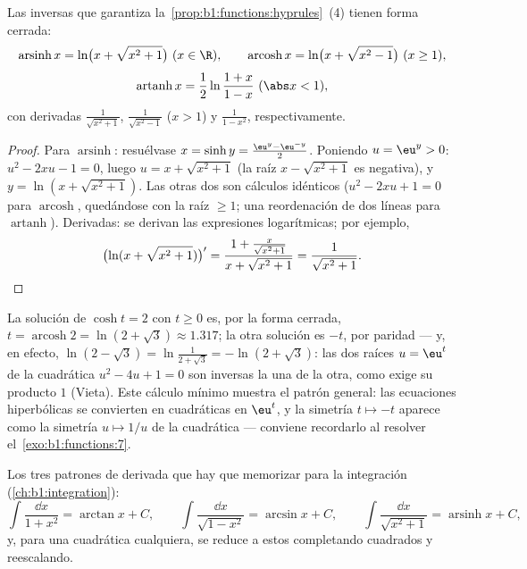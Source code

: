 \begin{proposition}\label{prop:b1:functions:invhyp}
Las inversas que garantiza la~\cref{prop:b1:functions:hyprules}~(4)
tienen forma cerrada:
\[
\operatorname{arsinh} x = \ln\bigl(x + \sqrt{x^2 + 1}\bigr)
\ (x \in \R),
\qquad
\operatorname{arcosh} x = \ln\bigl(x + \sqrt{x^2 - 1}\bigr)
\ (x \geq 1),
\]
\[
\operatorname{artanh} x = \frac 12 \ln\frac{1 + x}{1 - x}
\ (\abs x < 1),
\]
con derivadas $\frac{1}{\sqrt{x^2+1}}$, $\frac{1}{\sqrt{x^2-1}}$
($x > 1$) y $\frac{1}{1 - x^2}$, respectivamente.
\end{proposition}

\begin{proof}
Para $\operatorname{arsinh}$: resuélvase $x = \sinh y = \frac{\eu^y -
\eu^{-y}}{2}$. Poniendo $u = \eu^y > 0$: $u^2 - 2xu - 1 = 0$, luego
$u = x + \sqrt{x^2 + 1}$ (la raíz $x - \sqrt{x^2+1}$ es negativa), y
$y = \ln(x + \sqrt{x^2+1})$. Las otras dos son cálculos idénticos
($u^2 - 2xu + 1 = 0$ para $\operatorname{arcosh}$, quedándose con la
raíz $\geq 1$; una reordenación de dos líneas para
$\operatorname{artanh}$). Derivadas: se derivan las expresiones
logarítmicas; por ejemplo,
\[
\bigl(\ln(x + \sqrt{x^2+1})\bigr)'
= \frac{1 + \frac{x}{\sqrt{x^2+1}}}{x + \sqrt{x^2+1}}
= \frac{1}{\sqrt{x^2 + 1}} . \qedhere
\]
\end{proof}

\begin{example}\label{ex:b1:functions:arcoshtwo}
La solución de $\cosh t = 2$ con $t \geq 0$ es, por la forma cerrada,
$t = \operatorname{arcosh} 2 = \ln(2 + \sqrt3) \approx 1.317$; la otra
solución es $-t$, por paridad --- y, en efecto,
$\ln(2 - \sqrt3) = \ln\frac1{2 + \sqrt3} = -\ln(2 + \sqrt3)$: las dos
raíces $u = \eu^t$ de la cuadrática $u^2 - 4u + 1 = 0$ son inversas la
una de la otra, como exige su producto $1$ (Vieta). Este cálculo
mínimo muestra el patrón general: las ecuaciones hiperbólicas se
convierten en cuadráticas en $\eu^t$, y la simetría $t \mapsto -t$
aparece como la simetría $u \mapsto 1/u$ de la cuadrática --- conviene
recordarlo al resolver el~\cref{exo:b1:functions:7}.
\end{example}

\begin{method}\label{met:b1:functions:primitive}
Los tres patrones de derivada que hay que memorizar para la integración
(\cref{ch:b1:integration}):
\[
\int \frac{\dd x}{1 + x^2} = \arctan x + C,
\qquad
\int \frac{\dd x}{\sqrt{1 - x^2}} = \arcsin x + C,
\qquad
\int \frac{\dd x}{\sqrt{x^2 + 1}} = \operatorname{arsinh} x + C,
\]
y, para una cuadrática cualquiera, se reduce a estos completando
cuadrados y reescalando.
\end{method}

